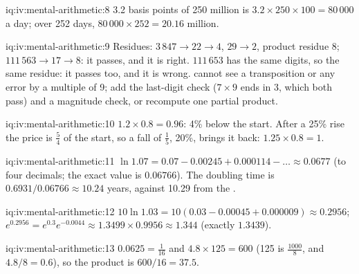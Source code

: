 \begin{solution}{iq:iv:mental-arithmetic:8}
3.2 basis points of 250 million is $3.2 \times 250 \times 100 = 80\,000$ a day; over 252 days, $80\,000 \times
252 = 20.16$ million.
\end{solution}

\begin{solution}{iq:iv:mental-arithmetic:9}
Residues: $3\,847 \to 22 \to 4$, $29 \to 2$, product residue 8; $111\,563 \to 17 \to 8$: it passes, and it is
right. $111\,653$ has the same digits, so the same residue: it passes too, and it is wrong. 
cannot see a transposition or any error by a multiple of 9; add the last-digit check ($7 \times 9$ ends in 3,
which both pass) and a magnitude check, or recompute one partial product.
\end{solution}

\begin{solution}{iq:iv:mental-arithmetic:10}
$1.2 \times 0.8 = 0.96$: 4\% below the start. After a 25\% rise the price is $\tfrac54$ of the start, so a fall of
$\tfrac15$, 20\%, brings it back: $1.25 \times 0.8 = 1$.
\end{solution}

\begin{solution}{iq:iv:mental-arithmetic:11}
$\ln 1.07 = 0.07 - 0.00245 + 0.000114 - \dots \approx 0.0677$ (to four decimals; the exact value is
$0.06766$). The doubling time is $0.6931/0.06766 \approx 10.24$ years, against 10.29 from the .
\end{solution}

\begin{solution}{iq:iv:mental-arithmetic:12}
$10 \ln 1.03 = 10(0.03 - 0.00045 + 0.000009) \approx 0.2956$; $e^{0.2956} = e^{0.3} e^{-0.0044} \approx 1.3499
\times 0.9956 \approx 1.344$ (exactly $1.3439$).
\end{solution}

\begin{solution}{iq:iv:mental-arithmetic:13}
$0.0625 = \tfrac1{16}$ and $4.8 \times 125 = 600$ (125 is $\tfrac{1000}8$, and $4.8/8 = 0.6$), so the product is
$600/16 = 37.5$.
\end{solution}

